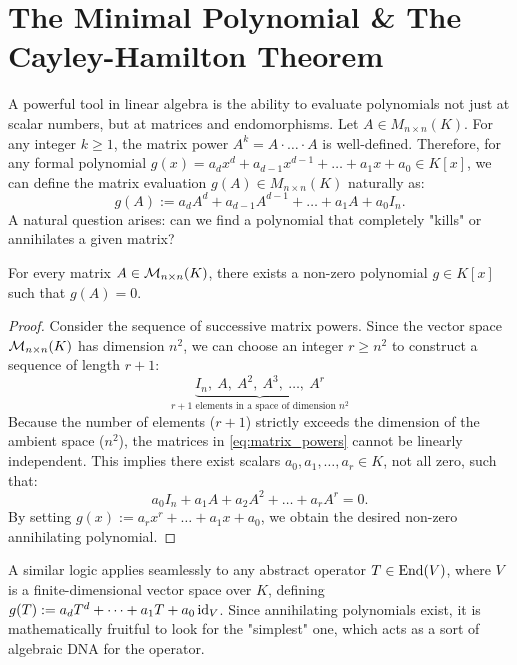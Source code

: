 \setcounter{section}{3} %

\section{The Minimal Polynomial \& The Cayley-Hamilton Theorem}

A powerful tool in linear algebra is the ability to evaluate polynomials not just at scalar numbers, but at matrices and endomorphisms. Let $A \in M_{n \times n}(K)$. For any integer $k \ge 1$, the matrix power $A^k = A \cdot \dots \cdot A$ is well-defined. Therefore, for any formal polynomial $g(x) = a_d x^d + a_{d-1}x^{d-1} + \dots + a_1 x + a_0 \in K[x]$, we can define the matrix evaluation $g(A) \in M_{n \times n}(K)$ naturally as:
\[
g(A) := a_d A^d + a_{d-1}A^{d-1} + \dots + a_1 A + a_0 I_n.
\]
A natural question arises: can we find a polynomial that completely "kills" or annihilates a given matrix?

\begin{claim*}\label{claim:existence_annihilating}
  For every matrix $A \in \mathcal{M}_{n \times n}(K)$, there exists a non-zero polynomial $g \in K[x]$ such that $g(A) = 0$.
\end{claim*}

\begin{proof}
  Consider the sequence of successive matrix powers. Since the vector space $\mathcal{M}_{n \times n}(K)$ has dimension $n^2$, we can choose an integer $r \ge n^2$ to construct a sequence of length $r+1$:
  \begin{equation} \label{eq:matrix_powers}
    \underbrace{I_n, \ A, \ A^2, \ A^3, \ \dots, \ A^r}_{r+1 \text{ elements in a space of dimension } n^2}
  \end{equation}
  Because the number of elements ($r+1$) strictly exceeds the dimension of the ambient space ($n^2$), the matrices in \eqref{eq:matrix_powers} cannot be linearly independent. This implies there exist scalars $a_0, a_1, \dots, a_r \in K$, not all zero, such that:
  \[
  a_0 I_n + a_1 A + a_2 A^2 + \dots + a_r A^r = 0.
  \]
  By setting $g(x) := a_r x^r + \dots + a_1 x + a_0$, we obtain the desired non-zero annihilating polynomial.
\end{proof}

A similar logic applies seamlessly to any abstract operator $T \in \operatorname{End}(V)$, where $V$ is a finite-dimensional vector space over $K$, defining $g(T) := a_d T^d + \dots + a_1 T + a_0 \operatorname{id}_V$. Since annihilating polynomials exist, it is mathematically fruitful to look for the "simplest" one, which acts as a sort of algebraic DNA for the operator.

